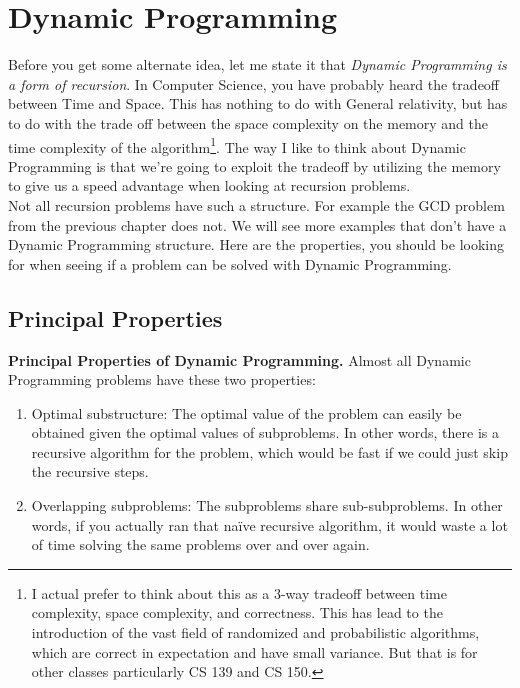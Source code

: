 \documentclass[11pt]{article}
\theoremstyle{plain}
\theoremstyle{definition}
\numberwithin{equation}{section}
\numberwithin{figure}{section}
\begin{document}
\newpage
\section{Dynamic Programming}

Before you get some alternate idea, let me state it that \emph{Dynamic Programming is a form of recursion}. In Computer Science, you have probably heard the tradeoff between Time and Space. This has nothing to do with General relativity, but has to do with the trade off between the space complexity on the memory and the time complexity of the algorithm\footnote{I actual prefer to think about this as a 3-way tradeoff between time complexity, space complexity, and correctness. This has lead to the introduction of the vast field of randomized and probabilistic algorithms, which are correct in expectation and have small variance. But that is for other classes particularly CS 139 and CS 150.}. The way I like to think about Dynamic Programming is that we're going to exploit the tradeoff by utilizing the memory to give us a speed advantage when looking at recursion problems. \\

\noindent Not all recursion problems have such a structure. For example the GCD problem from the previous chapter does not. We will see more examples that don't have a Dynamic Programming structure. Here are the properties, you should be looking for when seeing if a problem can be solved with Dynamic Programming.

\subsection{Principal Properties}

\begin{framed}
\noindent \textbf{Principal Properties of Dynamic Programming.} Almost all Dynamic Programming problems have these two properties:
\begin{enumerate}
\item Optimal substructure: The optimal value of the problem can easily be obtained given the optimal values of subproblems. In other words, there is a recursive algorithm for the problem, which would be fast if we could just skip the recursive steps.
\item Overlapping subproblems: The subproblems share sub-subproblems. In other words, if you actually ran that na{\"i}ve recursive algorithm, it would waste a lot of time solving the same problems over and over again.
\end{enumerate}
\end{framed}
\end{document}
